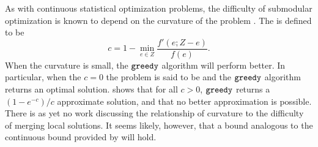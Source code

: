 \documentclass[thesis.tex]{subfiles}
\newcommand{\greedy}{\mkprocedure{greedy}}
\begin{document}
As with continuous statistical optimization problems,
the difficulty of submodular optimization is known to depend on the curvature of the problem
\citep{vondrak2010submodularity}.
The  is defined to be
\begin{equation}
    c = 1 - \min_{e\in Z} \frac{f'(e;Z-e)}{f(e)}
    .
\end{equation}
When the curvature is small, the $\greedy$ algorithm will perform better.
In particular, when the $c=0$ the problem is said to be  and the $\greedy$ algorithm returns an optimal solution.
\citet{vondrak2010submodularity} shows that for all $c>0$, $\greedy$ returns a $(1-e^{-c})/c$ approximate solution,
and that no better approximation is possible.
There is as yet no work discussing the relationship of curvature to the difficulty of merging local solutions.
It seems likely, however, that a bound analogous to the continuous bound provided by \citet{liu2014distributed} will hold.

%
%
\end{document}
